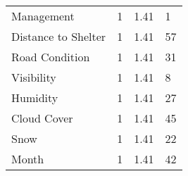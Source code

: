 \begin{table}[htp]
\begin{tabularx}{0.9\textwidth}{lYYY}
  Management &   1 & 1.41 & 1 \\ 
  Distance to Shelter &   1 & 1.41 & 57 \\ 
  Road Condition &   1 & 1.41 & 31 \\ 
  Visibility &   1 & 1.41 & 8 \\ 
  Humidity &   1 & 1.41 & 27 \\ 
  Cloud Cover &   1 & 1.41 & 45 \\ 
  Snow &   1 & 1.41 & 22 \\ 
  Month &   1 & 1.41 & 42 \\ 
   \hline
\end{tabularx}
\label{var_rep}
\end{table}


%